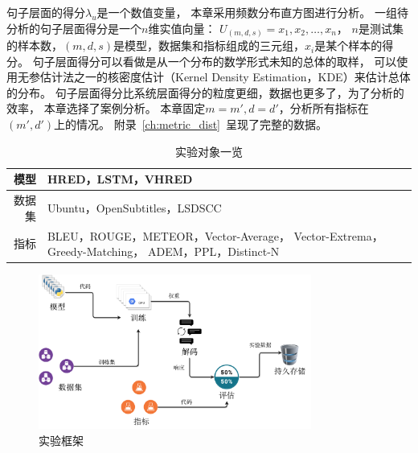 句子层面的得分$\lambda_u$是一个数值变量，
本章采用频数分布直方图进行分析。
一组待分析的句子层面得分是一个$n$维实值向量： $U_{(m, d, s)} = x_1, x_2, \dots, x_n$，
$n$是测试集的样本数，$(m, d, s)$是模型，数据集和指标组成的三元组，$x_i$是某个样本的得分。
句子层面得分可以看做是从一个分布的数学形式未知的总体的取样，
可以使用无参估计法之一的核密度估计（Kernel Density Estimation，KDE）来估计总体的分布。
句子层面得分比系统层面得分的粒度更细，数据也更多了，为了分析的效率，
本章选择了案例分析。
本章固定$m = m', d = d'$，分析所有指标在$(m', d')$上的情况。
附录~\ref{ch:metric_dist}~呈现了完整的数据。

\begin{table}[H]
    \centering
    \caption{实验对象一览}
    \label{tab:experiment_triples}
    \begin{tabular}{|r|m{}|}
        \hline
        模型 & HRED，LSTM，VHRED \\
        \hline
        数据集 & Ubuntu，OpenSubtitles，LSDSCC \\
        \hline
        指标 & BLEU，ROUGE，METEOR，Vector-Average，
        Vector-Extrema，Greedy-Matching，
        ADEM，PPL，Distinct-N \\
        \hline
    \end{tabular}
\end{table}

\begin{figure}[H]
    \centering
    \includegraphics[width=0.8\textwidth]{figure/drawio/eval_v4.pdf}
    \caption{实验框架}
    \label{fig:framework}
\end{figure}

